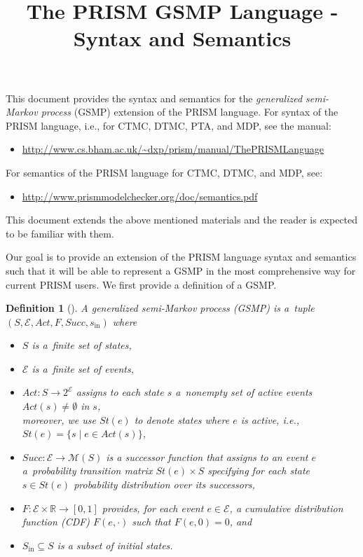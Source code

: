 \documentclass{article}
\title{The PRISM GSMP Language - Syntax and Semantics}
\newtheorem*{definition*}{Definition}
\newcommand{\Rset}{\mathbb{R}}
\newcommand{\calM}{\mathcal{M}}
\newcommand{\calG}{\mathcal{G}}
\newcommand{\calE}{\mathcal{E}}
\renewcommand{\_}{\underline{~}}
\newcommand{\events}{{\calE}}
\newcommand{\suc}{Succ}
\newcommand{\initstate}{s_\mathrm{in}}
\newcommand{\initstates}{S_\mathrm{in}}
\newcommand{\act}{Act}
\newcommand{\transmats}{\calM}
\begin{document}
\maketitle

\noindent
This document provides the syntax and semantics for the \emph{generalized semi-Markov process} (GSMP) extension of the PRISM language.
For syntax of the PRISM language, i.e., for CTMC, DTMC, PTA, and MDP, see the manual:
\begin{itemize}
	\item \url{http://www.cs.bham.ac.uk/~dxp/prism/manual/ThePRISMLanguage}
\end{itemize}
For semantics of the PRISM language for CTMC, DTMC, and MDP, see:
\begin{itemize}
	\item \url{http://www.prismmodelchecker.org/doc/semantics.pdf}
\end{itemize}
This document extends the above mentioned materials and the reader is expected to be familiar with them.

Our goal is to provide an extension of the PRISM language syntax and semantics such that it will be able to represent a GSMP in the most comprehensive way for current PRISM users. 
We first provide a definition of a GSMP.

\begin{definition*}[\cite{Haas:book}] 
	A generalized semi-Markov process (GSMP) is a~tuple $%
	(S,\events,\act,F,\suc,\initstate)$ where
	\begin{itemize}
		\item $S$ is a~finite set of states,
		\item $\events$ is a~finite set of \emph{events},
		\item $\act \colon S \to 2^{\events}$ assigns to each state $s$ a~nonempty set of active events $\act(s) \not = \emptyset$ in $s$,\\ moreover, we use $St(e)$ to denote states where $e$ is active, i.e., $St(e)=\{s \mid e \in \act(s)\}$,
		\item $\suc : \events \to \transmats(S)$ is a \emph{successor function} that assigns to an event $e$ a~probability transition matrix $St(e)\times S$ 
		specifying for each state $s\in St(e)$ probability distribution over its successors,	
		\item $F\colon \events \times \Rset \to [0,1]$ provides, for each event $e \in \events$, a cumulative distribution function (CDF) $F(e,\cdot)$ such that $F(e,0)=0$, and 
		\item $\initstates \subseteq S$ is a subset of \emph{initial states}.
	\end{itemize}
\end{definition*}
\end{document}

